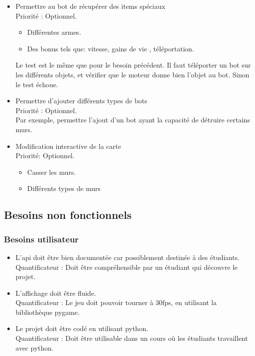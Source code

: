 \documentclass[french]{article}
\begin{document}
\begin{itemize}
        \item Permettre au bot de récupérer des items spéciaux \\
            Priorité : Optionnel.
            \begin{itemize}
                \item Différentes armes.
                \item Des bonus tels que: vitesse, gains de vie , téléportation. \\
            \end{itemize}
            Le test est le même que pour le besoin précédent. Il faut téléporter un bot sur les différents objets, et vérifier que le moteur donne bien l'objet au bot. Sinon le test échoue.\\
            
        \item Permettre d'ajouter différents types de bots \\
            Priorité : Optionnel. \\
            Par exemple, permettre l'ajout d'un bot ayant la capacité de détruire certains murs.\\
        
        \item Modification interactive de la carte \\
            Priorité: Optionnel.
             \begin{itemize}
                \item Casser les murs.
                \item Différents types de murs \\
            \end{itemize}
    \end{itemize}


\subsection{Besoins non fonctionnels}
\subsubsection{Besoins utilisateur}
    \begin{itemize}
        \item L'api doit être bien documentée car possiblement destinée à des étudiants.\\
            Quantificateur : Doit être compréhensible par un étudiant qui découvre le projet. \\

        \item L'affichage doit être fluide.\\
            Quantificateur : Le jeu doit pouvoir tourner à 30fps, en utilisant la bibliothèque pygame.\\

        \item Le projet doit être codé en utilisant python. \\
            Quantificateur : Doit être utilisable dans un cours où les étudiants travaillent avec python.\\ %

    \end{itemize}
\end{document}
